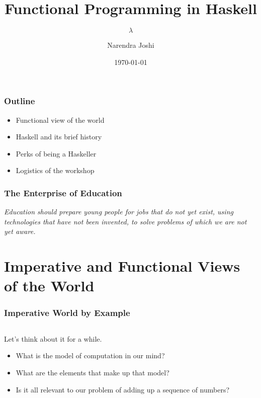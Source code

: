 \documentclass{beamer}
\title{Functional Programming in Haskell}
\subtitle{$\lambda$}
\author{Narendra Joshi}
\date{\today}
\begin{document}
\begin{frame}
  \titlepage
\end{frame}

\begin{frame}[t]
  \frametitle{Outline}

  \begin{itemize}
  \item{Functional view of the world}
  \item{Haskell and its brief history}
  \item{Perks of being a Haskeller}
  \item{Logistics of the workshop}
  \end{itemize}

\end{frame}

\begin{frame}[c]
  \frametitle{The Enterprise of Education}
  \begin{block}{}
    \emph{ Education should prepare young people for jobs that do not
      yet exist, using technologies that have not been invented,
      to solve problems of which we are not yet aware.}
  \end{block}
\end{frame}

\section{Imperative and Functional Views of the World}

\begin{frame}[fragile,t]
  \frametitle{Imperative World by Example}

  \inputminted[frame=lines,fontsize=\footnotesize,linenos=true]{c}{code/slides/sumfive.c}

  Let's think about it for a while.

  \begin{itemize}
  \item What is the model of computation in our mind?
  \item What are the elements that make up that model?
  \item Is it all relevant to our problem of adding up a sequence of numbers?
  \end{itemize}

\end{frame}
\end{document}

